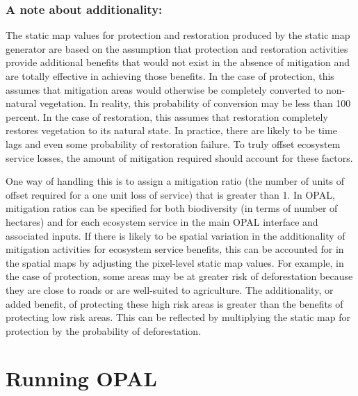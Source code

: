 \documentclass[11pt,letterpaper]{report}
\begin{document}
	\subsection*{A note about additionality:}
	
	The static map values for protection and restoration produced by the static map generator are based on the assumption that protection and restoration activities provide additional benefits that would not exist in the absence of mitigation and are totally effective in achieving those benefits. In the case of protection, this assumes that mitigation areas would otherwise be completely converted to non-natural vegetation. In reality, this probability of conversion may be less than 100 percent. In the case of restoration, this assumes that restoration completely restores vegetation to its natural state. In practice, there are likely to be time lags and even some probability of restoration failure. To truly offset ecosystem service losses, the amount of mitigation required should account for these factors. 
	
	One way of handling this is to assign a mitigation ratio (the number of units of offset required for a one unit loss of service) that is greater than 1. In OPAL, mitigation ratios can be specified for both biodiversity (in terms of number of hectares) and for each ecosystem service in the main OPAL interface and associated inputs. If there is likely to be spatial variation in the additionality of mitigation activities for ecosystem service benefits, this can be accounted for in the spatial maps by adjusting the pixel-level static map values. For example, in the case of protection, some areas may be at greater risk of deforestation because they are close to roads or are well-suited to agriculture. The additionality, or added benefit, of protecting these high risk areas is greater than the benefits of protecting low risk areas. This can be reflected by multiplying the static map for protection by the probability of deforestation.
	

\chapter{Running OPAL}
\label{ch:runningOPAL}
\end{document}
